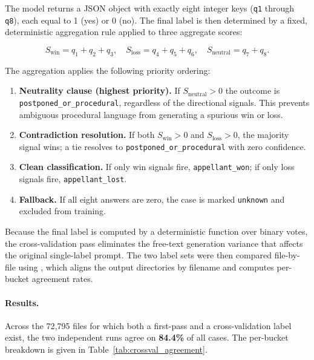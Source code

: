 The model returns a JSON object with exactly eight integer keys (\texttt{q1}
through \texttt{q8}), each equal to 1 (yes) or 0 (no). The final label is then
determined by a fixed, deterministic aggregation rule applied to three aggregate
scores:

\[
  S_\text{win} = q_1 + q_2 + q_3, \quad
  S_\text{loss} = q_4 + q_5 + q_6, \quad
  S_\text{neutral} = q_7 + q_8.
\]

The aggregation applies the following priority ordering:

\begin{enumerate}
  \item \textbf{Neutrality clause (highest priority).} If $S_\text{neutral} > 0$
    the outcome is \texttt{postponed\_or\_procedural}, regardless of the
    directional signals. This prevents ambiguous procedural language from
    generating a spurious win or loss.
  \item \textbf{Contradiction resolution.} If both $S_\text{win} > 0$ and
    $S_\text{loss} > 0$, the majority signal wins; a tie resolves to
    \texttt{postponed\_or\_procedural} with zero confidence.
  \item \textbf{Clean classification.} If only win signals fire,
    \texttt{appellant\_won}; if only loss signals fire,
    \texttt{appellant\_lost}.
  \item \textbf{Fallback.} If all eight answers are zero, the case is marked
    \texttt{unknown} and excluded from training.
\end{enumerate}

Because the final label is computed by a deterministic function over binary
votes, the cross-validation pass eliminates the free-text generation variance
that affects the original single-label prompt. The two label sets were then
compared file-by-file using , which aligns the output
directories by filename and computes per-bucket agreement rates.

\paragraph{Results.}
Across the 72{,}795 files for which both a first-pass and a cross-validation
label exist, the two independent runs agree on \textbf{84.4\%} of all cases.
The per-bucket breakdown is given in Table~\ref{tab:crossval_agreement}.

